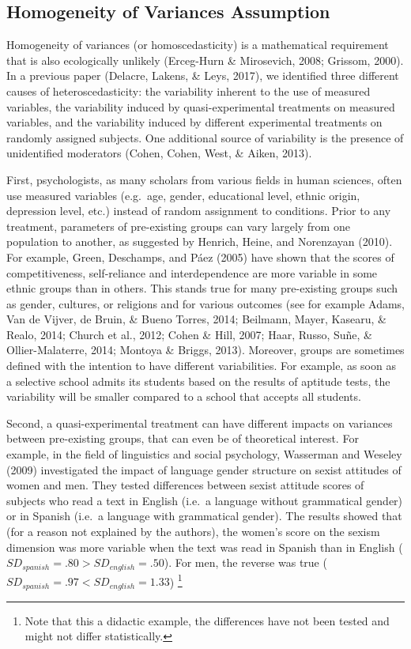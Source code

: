 \documentclass[man,floatsintext]{apa6}
\let\rmarkdownfootnote\footnote%
\def\footnote{\protect\rmarkdownfootnote}
\begin{document}
\hypertarget{homogeneity-of-variances-assumption}{%
\subsection{Homogeneity of Variances Assumption}\label{homogeneity-of-variances-assumption}}

Homogeneity of variances (or homoscedasticity) is a mathematical requirement that is also ecologically unlikely (Erceg-Hurn \& Mirosevich, 2008; Grissom, 2000). In a previous paper (Delacre, Lakens, \& Leys, 2017), we identified three different causes of heteroscedasticity: the variability inherent to the use of measured variables, the variability induced by quasi-experimental treatments on measured variables, and the variability induced by different experimental treatments on randomly assigned subjects. One additional source of variability is the presence of unidentified moderators (Cohen, Cohen, West, \& Aiken, 2013).

First, psychologists, as many scholars from various fields in human sciences, often use measured variables (e.g.~age, gender, educational level, ethnic origin, depression level, etc.) instead of random assignment to conditions. Prior to any treatment, parameters of pre-existing groups can vary largely from one population to another, as suggested by Henrich, Heine, and Norenzayan (2010). For example, Green, Deschamps, and Páez (2005) have shown that the scores of competitiveness, self-reliance and interdependence are more variable in some ethnic groups than in others. This stands true for many pre-existing groups such as gender, cultures, or religions and for various outcomes (see for example Adams, Van de Vijver, de Bruin, \& Bueno Torres, 2014; Beilmann, Mayer, Kasearu, \& Realo, 2014; Church et al., 2012; Cohen \& Hill, 2007; Haar, Russo, Suñe, \& Ollier-Malaterre, 2014; Montoya \& Briggs, 2013). Moreover, groups are sometimes defined with the intention to have different variabilities. For example, as soon as a selective school admits its students based on the results of aptitude tests, the variability will be smaller compared to a school that accepts all students.

Second, a quasi-experimental treatment can have different impacts on variances between pre-existing groups, that can even be of theoretical interest. For example, in the field of linguistics and social psychology, Wasserman and Weseley (2009) investigated the impact of language gender structure on sexist attitudes of women and men. They tested differences between sexist attitude scores of subjects who read a text in English (i.e.~a language without grammatical gender) or in Spanish (i.e.~a language with grammatical gender). The results showed that (for a reason not explained by the authors), the women's score on the sexism dimension was more variable when the text was read in Spanish than in English (\(SD_{spanish}=.80 > SD_{english}=.50\)). For men, the reverse was true (\(SD_{spanish}=.97 < SD_{english}=1.33\)) \footnote{Note that this a didactic example, the differences have not been tested and might not differ statistically.}
\end{document}
